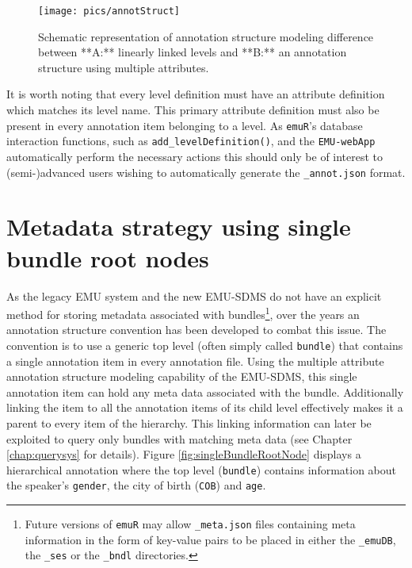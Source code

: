 \documentclass[]{book}
\let\rmarkdownfootnote\footnote%
\def\footnote{\protect\rmarkdownfootnote}
\begin{document}
\begin{figure}

{\centering \texttt{[image: pics/annotStruct]} 

}

\caption{Schematic representation of annotation structure modeling difference between **A:** linearly linked levels and **B:** an annotation structure using multiple attributes.}\label{fig:paraLabels}
\end{figure}

It is worth noting that every level definition must have an attribute definition which matches its level name. This primary attribute definition must also be present in every annotation item belonging to a level. As \texttt{emuR}'s database interaction functions, such as \texttt{add\_levelDefinition()}, and the \texttt{EMU-webApp} automatically perform the necessary actions this should only be of interest to (semi-)advanced users wishing to automatically generate the \texttt{\_annot.json} format.

\hypertarget{metadata-strategy-using-single-bundle-root-nodes}{%
\section{Metadata strategy using single bundle root nodes}\label{metadata-strategy-using-single-bundle-root-nodes}}

As the legacy EMU system and the new EMU-SDMS do not have an explicit method for storing metadata associated with bundles\footnote{Future versions of \texttt{emuR} may allow \texttt{\_meta.json} files containing meta information in the form of key-value pairs to be placed in either the \texttt{\_emuDB}, the \texttt{\_ses} or the \texttt{\_bndl} directories.}, over the years an annotation structure convention has been developed to combat this issue. The convention is to use a generic top level (often simply called \texttt{bundle}) that contains a single annotation item in every annotation file. Using the multiple attribute annotation structure modeling capability of the EMU-SDMS, this single annotation item can hold any meta data associated with the bundle. Additionally linking the item to all the annotation items of its child level effectively makes it a parent to every item of the hierarchy. This linking information can later be exploited to query only bundles with matching meta data (see Chapter \ref{chap:querysys} for details). Figure \ref{fig:singleBundleRootNode} displays a hierarchical annotation where the top level (\texttt{bundle}) contains information about the speaker's \texttt{gender}, the city of birth (\texttt{COB}) and \texttt{age}.
\end{document}
